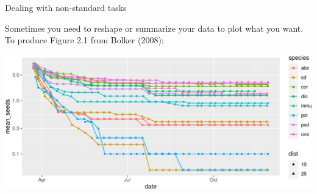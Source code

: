 \documentclass[
  ignorenonframetext,
]{beamer}
\newenvironment{Shaded}{\begin{snugshade}}{\end{snugshade}}
\newcommand{\DataTypeTok}[1]{\textcolor[rgb]{0.13,0.29,0.53}{#1}}
\newcommand{\KeywordTok}[1]{\textcolor[rgb]{0.13,0.29,0.53}{\textbf{#1}}}
\newcommand{\NormalTok}[1]{#1}
\newcommand{\OperatorTok}[1]{\textcolor[rgb]{0.81,0.36,0.00}{\textbf{#1}}}
\newcommand{\StringTok}[1]{\textcolor[rgb]{0.31,0.60,0.02}{#1}}
\begin{document}
\begin{frame}[fragile]{Dealing with non-standard tasks}
\protect\hypertarget{dealing-with-non-standard-tasks}{}

Sometimes you need to reshape or summarize your data to plot what you
want. To produce Figure 2.1 from Bolker (2008):

\scriptsize

\begin{Shaded}
\end{Shaded}

\includegraphics{data_viz_files/figure-beamer/unnamed-chunk-12-1.pdf}

\end{frame}
\end{document}

